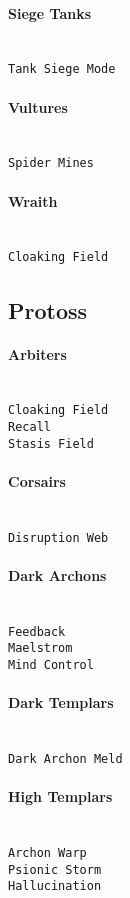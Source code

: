 \paragraph{Siege Tanks} \mbox{}\\
\verb|Tank Siege Mode| 

\paragraph{Vultures} \mbox{}\\
\verb|Spider Mines|

\paragraph{Wraith} \mbox{}\\
\verb|Cloaking Field| 

\subsection{Protoss}

\paragraph{Arbiters} \mbox{}\\
\verb|Cloaking Field| \\
\verb|Recall| \\
\verb|Stasis Field|

\paragraph{Corsairs} \mbox{}\\
\verb|Disruption Web|

\paragraph{Dark Archons} \mbox{}\\
\verb|Feedback| \\
\verb|Maelstrom| \\
\verb|Mind Control|

\paragraph{Dark Templars} \mbox{}\\
\verb|Dark Archon Meld|

\paragraph{High Templars} \mbox{}\\
\verb|Archon Warp| \\
\verb|Psionic Storm| \\
\verb|Hallucination|

